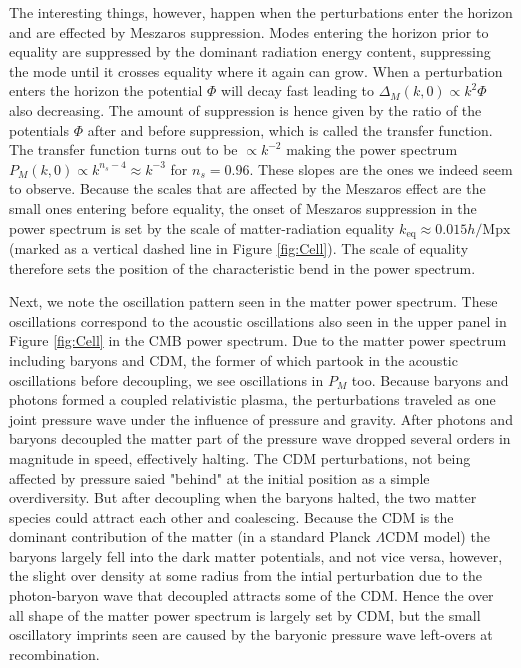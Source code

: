 \documentclass[twocolumn]{aastex62}
\begin{document}
The interesting things, however, happen when the perturbations enter the horizon and are effected by Meszaros suppression. Modes entering the horizon prior to equality are suppressed by the dominant radiation energy content, suppressing the mode until it crosses equality where it again can grow. When a perturbation enters the horizon the potential $\Phi$ will decay fast leading to $\Delta_M(k, 0)\propto k^2\Phi$ also decreasing. The amount of suppression is hence given by the ratio of the potentials $\Phi$ after and before suppression, which is called the transfer function. The transfer function turns out to be $\propto k^{-2}$ \citep[p. 203]{dodelson:2003} making the power spectrum $P_M(k, 0)\propto k^{n_s-4} \approx k^{-3}$ for $n_s = 0.96$. These slopes are the ones we indeed seem to observe. Because the scales that are affected by the Meszaros effect are the small ones entering before equality, the onset of Meszaros suppression in the power spectrum is set by the scale of matter-radiation equality $k_\text{eq} \approx 0.015 h/\mathrm{Mpx}$ (marked as a vertical dashed line in Figure \ref{fig:Cell}). The scale of equality therefore sets the position of the characteristic bend in the power spectrum.  

Next, we note the oscillation pattern seen in the matter power spectrum. These oscillations correspond to the acoustic oscillations also seen in the upper panel in Figure \ref{fig:Cell} in the CMB power spectrum. Due to the matter power spectrum including baryons and CDM, the former of which partook in the acoustic oscillations before decoupling, we see oscillations in $P_M$ too. Because baryons and photons formed a coupled relativistic plasma, the perturbations traveled as one joint pressure wave under the influence of pressure and gravity. After photons and baryons decoupled the matter part of the pressure wave dropped several orders in magnitude in speed, effectively halting. The CDM perturbations, not being affected by pressure saied "behind" at the initial position as a simple overdiversity. But after decoupling when the baryons halted, the two matter species could attract each other and coalescing. Because the CDM is the dominant contribution of the matter (in a standard Planck $\Lambda$CDM model) the baryons largely fell into the dark matter potentials, and not vice versa, however, the slight over density at some radius from the intial perturbation due to the photon-baryon wave that decoupled attracts some of the CDM. Hence the over all shape of the matter power spectrum is largely set by CDM, but the small oscillatory imprints seen are caused by the baryonic pressure wave left-overs at recombination.
\end{document}
